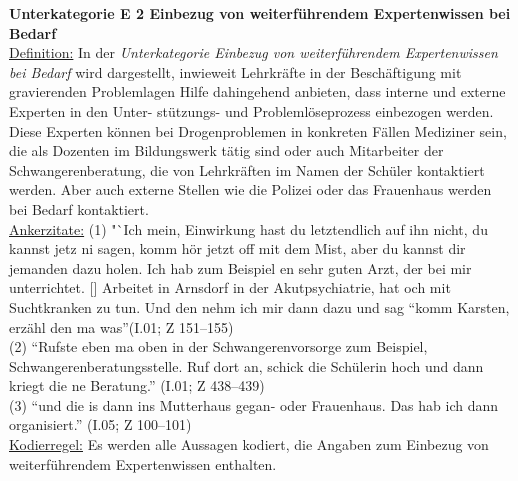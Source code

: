 \noindent
\textbf{Unterkategorie E 2 Einbezug von weiterführendem Expertenwissen bei Bedarf}\\
\underline{Definition:} In der \textit{Unterkategorie Einbezug von weiterführendem Expertenwissen bei Bedarf} wird dargestellt, inwieweit Lehrkräfte in der Beschäftigung mit gravierenden Problemlagen Hilfe dahingehend anbieten, dass interne und externe Experten in den Unter- stützungs- und Problemlöseprozess einbezogen werden. Diese Experten können bei Drogenproblemen in konkreten Fällen Mediziner sein, die als Dozenten im Bildungswerk tätig sind oder auch Mitarbeiter der Schwangerenberatung, die von Lehrkräften im Namen der Schüler kontaktiert werden. Aber auch externe Stellen wie die Polizei oder das Frauenhaus werden bei Bedarf kontaktiert.\\
\underline{Ankerzitate:} (1) "`Ich mein, Einwirkung hast du letztendlich auf ihn nicht, du kannst jetz ni sagen, komm hör jetzt off mit dem Mist, aber du kannst dir jemanden dazu holen. Ich hab zum Beispiel en sehr guten Arzt, der bei mir unterrichtet. [\punkte] Arbeitet in Arnsdorf in der Akutpsychiatrie, hat och mit Suchtkranken zu tun. Und den nehm ich mir dann dazu und sag "`komm Karsten, erzähl den ma was"'(I.01; Z 151--155)\\ (2) "`Rufste eben ma oben in der Schwangerenvorsorge zum Beispiel, Schwangerenberatungsstelle. Ruf dort an, schick die Schülerin hoch und dann kriegt die ne Beratung."' (I.01; Z 438--439)\\ (3) "`und die is dann ins Mutterhaus gegan- oder Frauenhaus. Das hab ich dann organisiert."' (I.05; Z 100--101)\\
\underline{Kodierregel:} Es werden alle Aussagen kodiert, die Angaben zum Einbezug von weiterführendem Expertenwissen enthalten.\\

